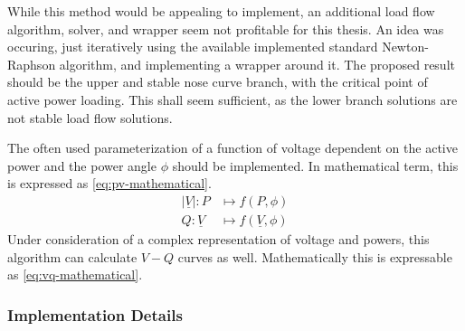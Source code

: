 While this method would be appealing to implement, an additional load flow algorithm, solver, and wrapper seem not profitable for this thesis.
An idea was occuring, just iteratively using the available implemented standard Newton-Raphson algorithm, and implementing a wrapper around it.
The proposed result should be the upper and stable nose curve branch, with the critical point of active power loading.
This shall seem sufficient, as the lower branch solutions are not stable load flow solutions.

The often used parameterization of a function of voltage dependent on the active power and the power angle $\phi$ should be implemented.
In mathematical term, this is expressed as \autoref{eq:pv-mathematical}.
\begin{align}
        \vert \underline{V} \vert : P &\mapsto f(P, \phi) \label{eq:pv-mathematical} \\[6pt]
        Q : \underline{V} &\mapsto f(\underline{V}, \phi) \label{eq:vq-mathematical}
\end{align}
Under consideration of a complex representation of voltage and powers, this algorithm can calculate $V-Q$ curves as well. 
Mathematically this is expressable as \autoref{eq:vq-mathematical}.

\subsubsection{Implementation Details}

